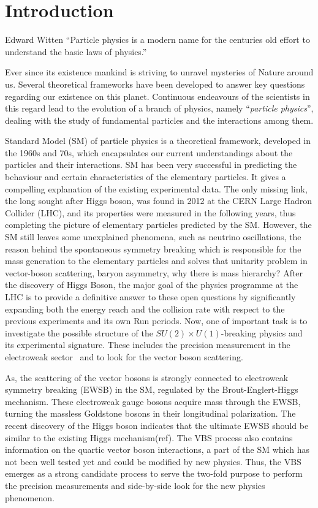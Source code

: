\chapter{Introduction}
\begin{chapquote}
{Edward Witten}
``Particle physics is a modern name for the centuries old effort to understand the basic laws of physics.''
\end{chapquote}
Ever since its existence mankind is striving to unravel mysteries of Nature around us. Several theoretical frameworks have been developed to answer key questions regarding our existence on this planet.  Continuous endeavours of the scientists in this regard lead to the evolution of a branch of physics, namely ``\textit{particle physics}'', dealing with the study of fundamental particles and the interactions among them. 

Standard Model (SM) of particle physics is a theoretical framework, developed in the 1960s and 70s, which encapsulates our current understandings about the particles and their interactions.
SM has been very successful in predicting the behaviour and certain characteristics of the elementary particles. It gives a compelling explanation of the existing experimental data.
The only missing link, the long sought after Higgs boson, was found in 2012 at the CERN Large Hadron Collider (LHC), and its properties were measured in the following years, thus completing the picture of elementary particles predicted by the SM.
However, the SM still leaves some unexplained phenomena, such as neutrino oscillations, the reason behind the spontaneous symmetry breaking which is responsible for the mass generation to the elementary particles and solves that unitarity problem in vector-boson scattering, baryon asymmetry, why there is mass hierarchy?
After the discovery of Higgs Boson, the major goal of the physics programme at the LHC is to provide a definitive answer to these open questions by significantly expanding both the energy reach and the collision rate with respect to 
the previous experiments and its own Run periods.
Now, one of important task is to investigate the possible structure of the $SU(2)\times U(1)$-breaking physics and its experimental signature. These includes the precision measurement in the electroweak sector~\cite{Baak2013} and to look for the vector boson scattering.

	
As, the scattering of the vector bosons is strongly connected to electroweak symmetry breaking (EWSB) in the SM, regulated by the Brout-Englert-Higgs mechanism.
These electroweak gauge bosons acquire mass through the EWSB, turning the massless Goldstone bosons in their longitudinal polarization.
The recent discovery of the Higgs boson indicates that the ultimate EWSB should be similar to  the existing Higgs mechanism(ref).
The VBS process also contains information on the quartic vector boson interactions, a part of the SM which has not been well tested yet and could be modified by new physics.
Thus, the VBS  emerges as a strong candidate process to serve the two-fold purpose to perform the precision measurements and side-by-side look for the new physics phenomenon.  


